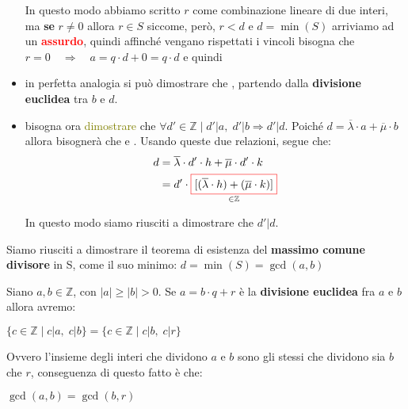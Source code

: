 \begin{boxA}
\begin{itemize}[nosep]
        In questo modo abbiamo scritto $r$ come combinazione lineare di due interi, ma \textbf{se} $r \neq 0$ allora $r \in S$ siccome, però, $r < d$ e $d = \min(S)$ arriviamo ad un \textcolor{red}{\textbf{assurdo}}, quindi affinché vengano rispettati i vincoli bisogna che $r = 0 \quad \Rightarrow \quad a = q \cdot d + 0 = q \cdot d$ e quindi 

        \item in perfetta analogia si può dimostrare che , partendo dalla \textbf{divisione euclidea} tra $b$ e $d$.
    \end{itemize}
\end{boxA}

\begin{boxA}
    \begin{itemize}[nosep]
        \item bisogna ora \textcolor{olive}{dimostrare} che $\forall d' \in \mathbb{Z} \; | \; d'|a, \; d'|b \Rightarrow d'|d$. Poiché $d = \overline{\lambda} \cdot a + \overline{\mu} \cdot b$ allora bisognerà che  e . Usando queste due relazioni, segue che:
        \begin{align*}
            d &= \overline{\lambda} \cdot d' \cdot h + \overline{\mu} \cdot d' \cdot k \\
            &= d' \cdot \underset{\in \mathbb{Z}}{\fcolorbox{red}{white}{$[(\overline{\lambda} \cdot h) + (\overline{\mu} \cdot k)]$}}
        \end{align*}

        In questo modo siamo riusciti a dimostrare che $d'|d$.
    \end{itemize}
    Siamo riusciti a dimostrare il teorema di esistenza del \textbf{massimo comune divisore} in S, come il suo minimo: $d = \min(S) = \gcd(a, b)$
\end{boxA}

Siano $a,b \in \mathbb{Z}$, con $|a| \geq |b| > 0$. Se $a = b \cdot q + r$ è la \textbf{divisione euclidea} fra $a$ e $b$ allora avremo:
\begin{center}
    $\{c \in \mathbb{Z} \; \vert \; c | a, \; c | b \} = \{c \in \mathbb{Z} \; | \; c | b, \; c | r \}$
\end{center}
Ovvero l'insieme degli interi che dividono $a$ e $b$ sono gli stessi che dividono sia $b$ che $r$, conseguenza di questo fatto è che:
\begin{center}
     $\gcd(a, b) = \gcd(b, r)$
\end{center}

